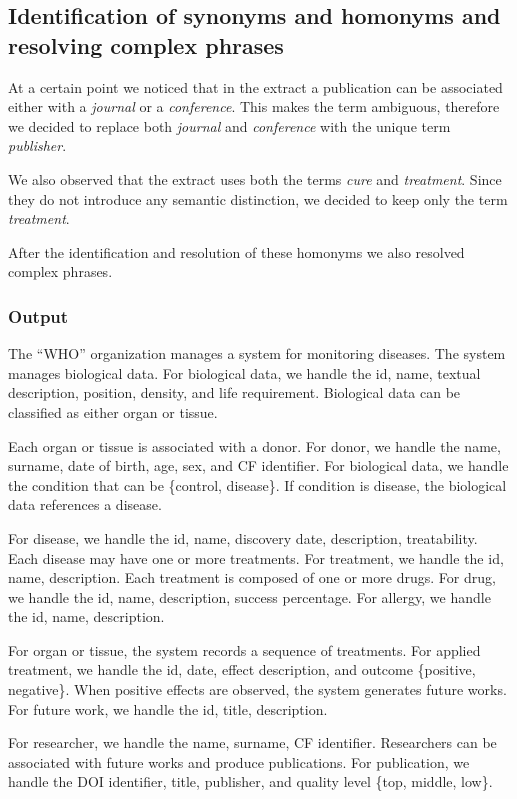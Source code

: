 \documentclass[11pt,a4paper]{article}
\begin{document}
\subsection{Identification of synonyms and homonyms and resolving complex phrases}

At a certain point we noticed that in the extract a publication can be associated either with a \textit{journal} or a \textit{conference}.  
This makes the term ambiguous, therefore we decided to replace both \textit{journal} and \textit{conference} with the unique term \textit{publisher}.  

We also observed that the extract uses both the terms \textit{cure} and \textit{treatment}.  
Since they do not introduce any semantic distinction, we decided to keep only the term \textit{treatment}.  

After the identification and resolution of these homonyms we also resolved complex phrases.

\subsubsection{Output}

The ``WHO'' organization manages a system for monitoring diseases.  
The system manages biological data. For biological data, we handle the id, name, textual description, position, density, and life requirement. Biological data can be classified as either organ or tissue.  

Each organ or tissue is associated with a donor. For donor, we handle the name, surname, date of birth, age, sex, and CF identifier. For biological data, we handle the condition that can be \{control, disease\}. If condition is disease, the biological data references a disease.  

For disease, we handle the id, name, discovery date, description, treatability. Each disease may have one or more treatments.  
For treatment, we handle the id, name, description. Each treatment is composed of one or more drugs.  
For drug, we handle the id, name, description, success percentage.  
For allergy, we handle the id, name, description.  

For organ or tissue, the system records a sequence of treatments. For applied treatment, we handle the id, date, effect description, and outcome \{positive, negative\}.  
When positive effects are observed, the system generates future works. For future work, we handle the id, title, description.  

For researcher, we handle the name, surname, CF identifier. Researchers can be associated with future works and produce publications.  
For publication, we handle the DOI identifier, title, publisher, and quality level \{top, middle, low\}.
\end{document}
